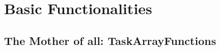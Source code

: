\chapter{Basic Functionalities}\label{chap:basics}
\section{The Mother of all: TaskArrayFunctions}\label{sec:taskarrayfunc}
